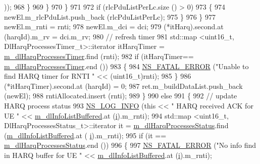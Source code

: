 \begin{DoxyCode}
      ));
968                         \}
969                     \}
970                 \}
971 
972               \textcolor{keywordflow}{if} (rlcPduListPerLc.size () > 0)
973                 \{
974                   newEl.m\_rlcPduList.push\_back (rlcPduListPerLc);
975                 \}
976             \}
977           newEl.m\_rnti = rnti;
978           newEl.m\_dci = dci;
979           (*itHarq).second.at (harqId).m\_rv = dci.m\_rv;
980           \textcolor{comment}{// refresh timer}
981           std::map <uint16\_t, DlHarqProcessesTimer\_t>::iterator itHarqTimer = 
      \hyperlink{classns3_1_1FdBetFfMacScheduler_a78314b001be9986429ecb13daac0885a}{m\_dlHarqProcessesTimer}.find (rnti);
982           \textcolor{keywordflow}{if} (itHarqTimer== \hyperlink{classns3_1_1FdBetFfMacScheduler_a78314b001be9986429ecb13daac0885a}{m\_dlHarqProcessesTimer}.end ())
983             \{
984               \hyperlink{group__fatal_ga5131d5e3f75d7d4cbfd706ac456fdc85}{NS\_FATAL\_ERROR} (\textcolor{stringliteral}{"Unable to find HARQ timer for RNTI "} << (uint16\_t)rnti);
985             \}
986           (*itHarqTimer).second.at (harqId) = 0;
987           ret.m\_buildDataList.push\_back (newEl);
988           rntiAllocated.insert (rnti);
989         \}
990       \textcolor{keywordflow}{else}
991         \{
992           \textcolor{comment}{// update HARQ process status}
993           \hyperlink{group__logging_gafbd73ee2cf9f26b319f49086d8e860fb}{NS\_LOG\_INFO} (\textcolor{keyword}{this} << \textcolor{stringliteral}{" HARQ received ACK for UE "} << 
      \hyperlink{classns3_1_1FdBetFfMacScheduler_ae987d949dcc264154314730346f4a7a8}{m\_dlInfoListBuffered}.at (\hyperlink{bernuolliDistribution_8m_a6f6ccfcf58b31cb6412107d9d5281426}{i}).m\_rnti);
994           std::map <uint16\_t, DlHarqProcessesStatus\_t>::iterator it = 
      \hyperlink{classns3_1_1FdBetFfMacScheduler_a93d8bf3298e9b289d9fcf70571b27b78}{m\_dlHarqProcessesStatus}.find (\hyperlink{classns3_1_1FdBetFfMacScheduler_ae987d949dcc264154314730346f4a7a8}{m\_dlInfoListBuffered}.at (
      \hyperlink{bernuolliDistribution_8m_a6f6ccfcf58b31cb6412107d9d5281426}{i}).m\_rnti);
995           \textcolor{keywordflow}{if} (it == \hyperlink{classns3_1_1FdBetFfMacScheduler_a93d8bf3298e9b289d9fcf70571b27b78}{m\_dlHarqProcessesStatus}.end ())
996             \{
997               \hyperlink{group__fatal_ga5131d5e3f75d7d4cbfd706ac456fdc85}{NS\_FATAL\_ERROR} (\textcolor{stringliteral}{"No info find in HARQ buffer for UE "} << 
      \hyperlink{classns3_1_1FdBetFfMacScheduler_ae987d949dcc264154314730346f4a7a8}{m\_dlInfoListBuffered}.at (\hyperlink{bernuolliDistribution_8m_a6f6ccfcf58b31cb6412107d9d5281426}{i}).m\_rnti);

\end{DoxyCode}
